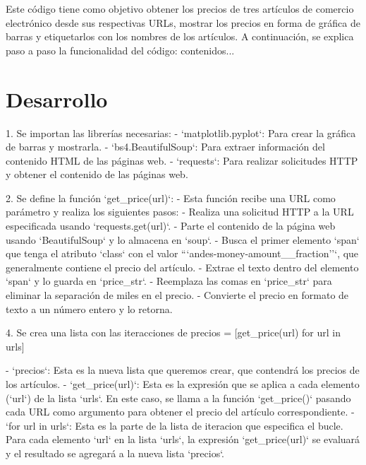 \documentclass[12pt]{article}
\begin{document}
	Este código tiene como objetivo obtener los precios de tres artículos de comercio electrónico desde sus respectivas URLs, mostrar los precios en forma de gráfica de barras y etiquetarlos con los nombres de los artículos. A continuación, se explica paso a paso la funcionalidad del código: contenidos...
	
	\section{Desarrollo}
	1. Se importan las librerías necesarias:
	- `matplotlib.pyplot`: Para crear la gráfica de barras y mostrarla.
	- `bs4.BeautifulSoup`: Para extraer información del contenido HTML de las páginas web.
	- `requests`: Para realizar solicitudes HTTP y obtener el contenido de las páginas web.
	
	2. Se define la función `get\_price(url)`:
	- Esta función recibe una URL como parámetro y realiza los siguientes pasos:
	- Realiza una solicitud HTTP a la URL especificada usando `requests.get(url)`.
	- Parte el contenido de la página web usando `BeautifulSoup` y lo almacena en `soup`.
	- Busca el primer elemento `span` que tenga el atributo `class` con el valor ```andes-money-amount\_\_fraction''`, que generalmente contiene el precio del artículo.
	- Extrae el texto dentro del elemento `span` y lo guarda en `price\_str`.
	- Reemplaza las comas en `price\_str` para eliminar la separación de miles en el precio.
	- Convierte el precio en formato de texto a un número entero y lo retorna.
	
	
	
	4. Se crea una lista con las iteracciones de precios = [get\_price(url) for url in urls]
	
	- `precios`: Esta es la nueva lista que queremos crear, que contendrá los precios de los artículos.
	- `get\_price(url)`: Esta es la expresión que se aplica a cada elemento (`url`) de la lista `urls`. En este caso, se llama a la función `get\_price()` pasando cada URL como argumento para obtener el precio del artículo correspondiente.
	- `for url in urls`: Esta es la parte de la lista de iteracion que especifica el bucle. Para cada elemento `url` en la lista `urls`, la expresión `get\_price(url)` se evaluará y el resultado se agregará a la nueva lista `precios`.
	
\end{document}
